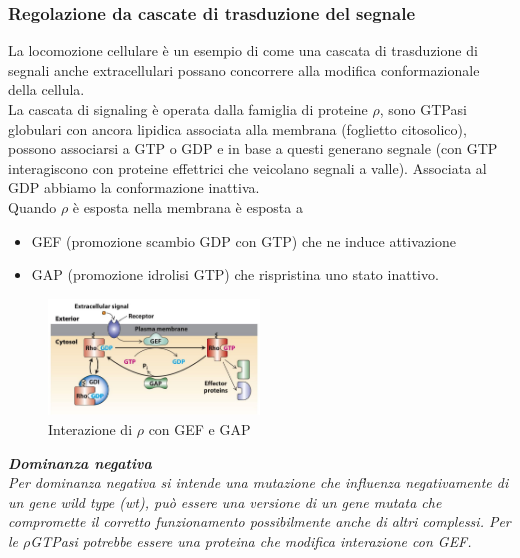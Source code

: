         \subsubsection{Regolazione da cascate di trasduzione del segnale}
            La locomozione cellulare è un esempio di come una cascata di trasduzione di segnali anche extracellulari possano concorrere alla modifica conformazionale della cellula.\\
            La cascata di signaling è operata dalla famiglia di proteine $\rho$, sono GTPasi globulari con ancora lipidica associata alla membrana (foglietto citosolico), possono associarsi a GTP o GDP e in base a questi generano segnale (con GTP interagiscono con proteine effettrici che veicolano segnali a valle). Associata al GDP abbiamo la conformazione inattiva.\\
            Quando $\rho$ è esposta nella membrana è esposta a
            \begin{itemize}
                \item GEF (promozione scambio GDP con GTP) che ne induce attivazione
                \item GAP (promozione idrolisi GTP) che rispristina uno stato inattivo.
            \end{itemize}
            \begin{figure}[h]
                \centering
                \includegraphics[width=0.5\textwidth]{images/RhoGEFeGAP.JPG}
                \caption{\small Interazione di $\rho$ con GEF e GAP}
                \label{fig:mesh1}
            \end{figure}
            
            \textit{
                \textbf{Dominanza negativa}\\
                Per dominanza negativa si intende una mutazione che influenza negativamente di un gene wild type (wt), può essere una versione di un gene mutata che compromette il corretto funzionamento possibilmente anche di altri complessi. Per le $\rho$GTPasi potrebbe essere una proteina che modifica interazione con GEF.\\}
            

